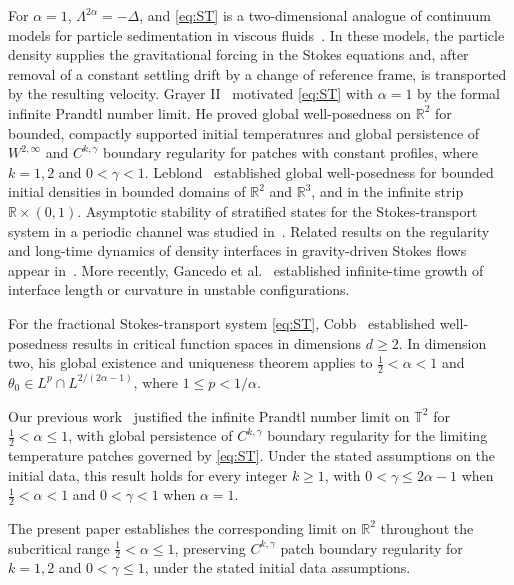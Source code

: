 \documentclass[reqno,11pt,a4paper]{amsart}
\begin{document}
For $\alpha=1$, $\Lambda^{2\alpha}=-\Delta$, and \eqref{eq:ST} is a two-dimensional analogue of continuum
models for particle sedimentation in viscous fluids~\cite{Hofer18,Mech19,HS25}.
In these models, the particle density supplies
the gravitational forcing in the Stokes equations
and, after removal of a constant settling drift
by a change of reference frame,
is transported by the resulting velocity.
Grayer II~\cite{Gray23} motivated \eqref{eq:ST} with $\alpha=1$
by the formal infinite Prandtl number limit.
He proved global well-posedness on $\mathbb R^2$
for bounded, compactly supported initial temperatures
and global persistence of $W^{2,\infty}$ and $C^{k,\gamma}$
boundary regularity for patches with constant profiles,
where $k=1,2$ and $0<\gamma<1$.
Leblond~\cite{Leb22} established global well-posedness
for bounded initial densities in bounded domains
of $\mathbb R^2$ and $\mathbb R^3$,
and in the infinite strip $\mathbb R\times(0,1)$.
Asymptotic stability of stratified states for the
Stokes-transport system in a periodic channel
was studied in~\cite{DGL23,Park25}.
Related results on the regularity and long-time dynamics
of density interfaces in gravity-driven Stokes flows
appear in~\cite{AMY00,GGBS23,GGBS24}.
More recently, Gancedo et al.~\cite{GGHSY26}
established infinite-time growth of interface length
or curvature in unstable configurations.

For the fractional Stokes-transport system \eqref{eq:ST},
Cobb~\cite{Cobb23} established well-posedness results
in critical function spaces in dimensions $d\geq2$.
In dimension two, his global existence and uniqueness
theorem applies to
$\frac12<\alpha<1$ and
$\theta_0\in L^p\cap L^{2/(2\alpha-1)}$,
where $1\leq p<1/\alpha$.

Our previous work~\cite{LXY25} justified
the infinite Prandtl number limit on $\mathbb T^2$
for $\frac12<\alpha\leq1$, with global persistence
of $C^{k,\gamma}$ boundary regularity
for the limiting temperature patches governed by
\eqref{eq:ST}.
Under the stated assumptions on the initial data,
this result holds for every integer $k\geq1$,
with $0<\gamma\leq2\alpha-1$ when $\frac12<\alpha<1$
and $0<\gamma<1$ when $\alpha=1$.

The present paper establishes the corresponding limit
on $\mathbb R^2$ throughout the subcritical range
$\frac12<\alpha\leq1$, preserving
$C^{k,\gamma}$ patch boundary regularity
for $k=1,2$ and $0<\gamma\leq1$,
under the stated initial data assumptions.
\end{document}
